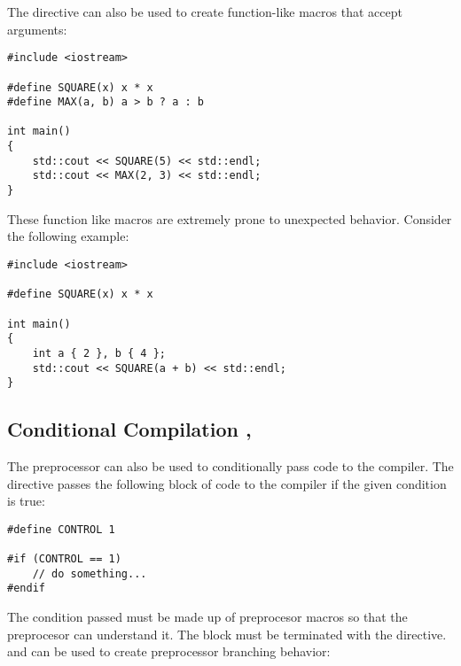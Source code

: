 \documentclass[12pt]{article}
\begin{document}
\vspace{1em}
\noindent
The  directive can also be used to create function-like macros that accept arguments:

\begin{lstlisting}[style=cxx]
#include <iostream>

#define SQUARE(x) x * x
#define MAX(a, b) a > b ? a : b

int main()
{
    std::cout << SQUARE(5) << std::endl;
    std::cout << MAX(2, 3) << std::endl;
}
\end{lstlisting}

\noindent
These function like macros are extremely prone to unexpected behavior.
Consider the following example:

\begin{lstlisting}[style=cxx]
#include <iostream>

#define SQUARE(x) x * x

int main()
{
    int a { 2 }, b { 4 };
    std::cout << SQUARE(a + b) << std::endl;
}
\end{lstlisting}


\begin{explanation}
\end{explanation}

\subsection{Conditional Compilation , }

\noindent
The preprocessor can also be used to conditionally pass code to the compiler.
The  directive passes the following block of code to the compiler if the given condition is true:

\begin{lstlisting}[style=cxx]
#define CONTROL 1

#if (CONTROL == 1)
    // do something...
#endif
\end{lstlisting}

\noindent
The condition passed must be made up of preprocesor macros so that the preprocesor can understand it.
The block must be terminated with the  directive.
 and  can be used to create preprocessor branching behavior:
\end{document}
